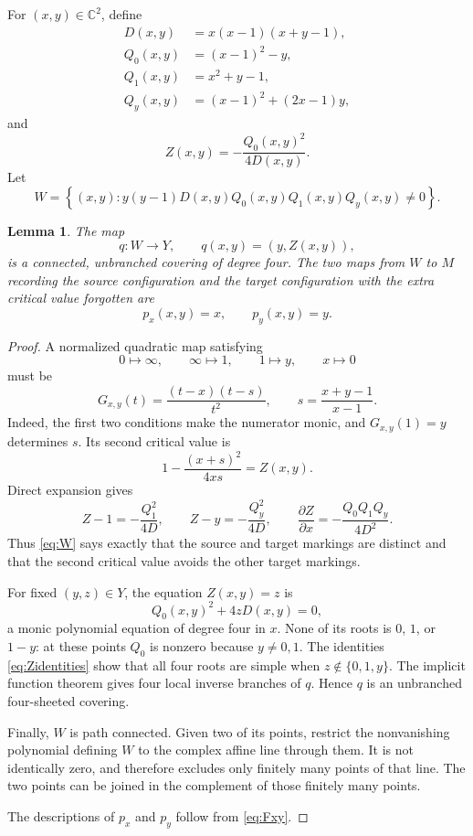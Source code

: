 \documentclass[11pt]{article}
\newcommand{\C}{\mathbb C}
\newtheorem{lemma}[theorem]{Lemma}
\theoremstyle{definition}
\theoremstyle{remark}
\begin{document}
For $(x,y)\in\C^2$, define
\[
\begin{split}
D(x,y)&=x(x-1)(x+y-1),\\
Q_0(x,y)&=(x-1)^2-y,\\
Q_1(x,y)&=x^2+y-1,\\
Q_y(x,y)&=(x-1)^2+(2x-1)y,
\end{split}
\]
and
\begin{equation}\label{eq:Z}
Z(x,y)=-\frac{Q_0(x,y)^2}{4D(x,y)}.
\end{equation}
Let
\begin{equation}\label{eq:W}
W=
\left\{(x,y):
y(y-1)D(x,y)Q_0(x,y)Q_1(x,y)Q_y(x,y)\ne0
\right\}.
\end{equation}

\begin{lemma}\label{lem:cover}
The map
\[
q:W\longrightarrow Y,\qquad q(x,y)=(y,Z(x,y)),
\]
is a connected, unbranched covering of degree four.
The two maps from $W$ to $M$ recording the source configuration and
the target configuration with the extra critical value forgotten are
\[
p_x(x,y)=x,\qquad p_y(x,y)=y.
\]
\end{lemma}

\begin{proof}
A normalized quadratic map satisfying
\[
0\longmapsto\infty,\qquad
\infty\longmapsto1,\qquad
1\longmapsto y,\qquad x\longmapsto0
\]
must be
\begin{equation}\label{eq:Fxy}
G_{x,y}(t)=\frac{(t-x)(t-s)}{t^2},
\qquad s=\frac{x+y-1}{x-1}.
\end{equation}
Indeed, the first two conditions make the numerator monic, and
$G_{x,y}(1)=y$ determines $s$.
Its second critical value is
\[
1-\frac{(x+s)^2}{4xs}=Z(x,y).
\]
Direct expansion gives
\begin{equation}\label{eq:Zidentities}
Z-1=-\frac{Q_1^2}{4D},\qquad
Z-y=-\frac{Q_y^2}{4D},\qquad
\frac{\partial Z}{\partial x}
=-\frac{Q_0Q_1Q_y}{4D^2}.
\end{equation}
Thus \eqref{eq:W} says exactly that the source and target markings
are distinct and that the second critical value avoids the other
target markings.

For fixed $(y,z)\in Y$, the equation $Z(x,y)=z$ is
\[
Q_0(x,y)^2+4zD(x,y)=0,
\]
a monic polynomial equation of degree four in $x$.
None of its roots is $0$, $1$, or $1-y$:
at these points $Q_0$ is nonzero because $y\ne0,1$.
The identities \eqref{eq:Zidentities} show that all four roots are
simple when $z\notin\{0,1,y\}$.  The implicit function theorem gives
four local inverse branches of $q$.  Hence $q$ is an unbranched
four-sheeted covering.

Finally, $W$ is path connected.  Given two of its points, restrict
the nonvanishing polynomial defining $W$ to the complex affine line
through them.  It is not identically zero, and therefore excludes only
finitely many points of that line.  The two points can be joined in
the complement of those finitely many points.

The descriptions of $p_x$ and $p_y$ follow from
\eqref{eq:Fxy}.
\end{proof}
\end{document}
